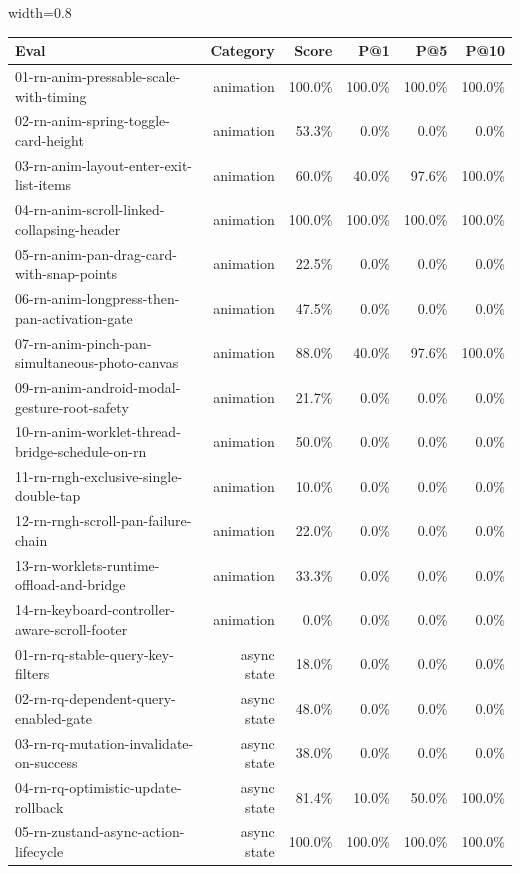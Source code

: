 \begin{table}[htbp]
\centering
\begin{adjustbox}{width=0.8\textwidth}
\begin{tabular}{lrrrrr}
\toprule
Eval & Category & Score & P@1 & P@5 & P@10 \\
\midrule
01-rn-anim-pressable-scale-with-timing & animation & 100.0\% & 100.0\% & 100.0\% & 100.0\% \\
02-rn-anim-spring-toggle-card-height & animation & 53.3\% & 0.0\% & 0.0\% & 0.0\% \\
03-rn-anim-layout-enter-exit-list-items & animation & 60.0\% & 40.0\% & 97.6\% & 100.0\% \\
04-rn-anim-scroll-linked-collapsing-header & animation & 100.0\% & 100.0\% & 100.0\% & 100.0\% \\
05-rn-anim-pan-drag-card-with-snap-points & animation & 22.5\% & 0.0\% & 0.0\% & 0.0\% \\
06-rn-anim-longpress-then-pan-activation-gate & animation & 47.5\% & 0.0\% & 0.0\% & 0.0\% \\
07-rn-anim-pinch-pan-simultaneous-photo-canvas & animation & 88.0\% & 40.0\% & 97.6\% & 100.0\% \\
09-rn-anim-android-modal-gesture-root-safety & animation & 21.7\% & 0.0\% & 0.0\% & 0.0\% \\
10-rn-anim-worklet-thread-bridge-schedule-on-rn & animation & 50.0\% & 0.0\% & 0.0\% & 0.0\% \\
11-rn-rngh-exclusive-single-double-tap & animation & 10.0\% & 0.0\% & 0.0\% & 0.0\% \\
12-rn-rngh-scroll-pan-failure-chain & animation & 22.0\% & 0.0\% & 0.0\% & 0.0\% \\
13-rn-worklets-runtime-offload-and-bridge & animation & 33.3\% & 0.0\% & 0.0\% & 0.0\% \\
14-rn-keyboard-controller-aware-scroll-footer & animation & 0.0\% & 0.0\% & 0.0\% & 0.0\% \\
01-rn-rq-stable-query-key-filters & async state & 18.0\% & 0.0\% & 0.0\% & 0.0\% \\
02-rn-rq-dependent-query-enabled-gate & async state & 48.0\% & 0.0\% & 0.0\% & 0.0\% \\
03-rn-rq-mutation-invalidate-on-success & async state & 38.0\% & 0.0\% & 0.0\% & 0.0\% \\
04-rn-rq-optimistic-update-rollback & async state & 81.4\% & 10.0\% & 50.0\% & 100.0\% \\
05-rn-zustand-async-action-lifecycle & async state & 100.0\% & 100.0\% & 100.0\% & 100.0\% \\

\end{tabular}
\end{adjustbox}
\end{table}
